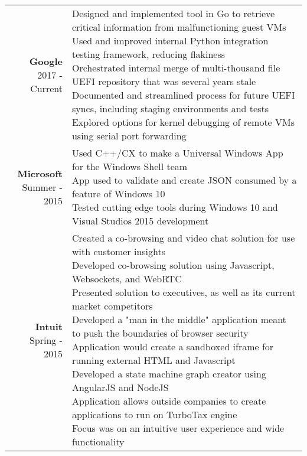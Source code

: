 \documentclass{article}
\makeatletter
\newcommand*\lineBr[2][c]{\begin{tabular}[#1]{@{}r@{}}#2\end{tabular}}
\newcommand*\lineBl[2][c]{\begin{tabular}[#1]{@{}l@{}}#2\end{tabular}}
\makeatother
\begin{document}
\begin{tabularx}{\textwidth}{ r | X }
  \vspace{4mm}
  \lineBr{ {\large {\bf Google }\\[2mm]2017 - Current}} &
  \lineBl{
	Designed and implemented tool in Go to retrieve critical information from malfunctioning guest VMs \\[2mm]
	Used and improved internal Python integration testing framework, reducing flakiness \\[2mm]
	Orchestrated internal merge of multi-thousand file UEFI repository that was several years stale \\[2mm]
	Documented and streamlined process for future UEFI syncs, including staging environments and tests \\[2mm]
	Explored options for kernel debugging of remote VMs using serial port forwarding
  } \\
  \vspace{4mm}
  \lineBr{ {\large {\bf Microsoft }\\[2mm]Summer - 2015}} &
  \lineBl{
    Used C++/CX to make a Universal Windows App for the Windows Shell team \\[2mm] 
    App used to validate and create JSON consumed by a feature of Windows 10 \\[2mm]
    Tested cutting edge tools during Windows 10 and Visual Studios 2015 development 
  } \\
  \vspace{4mm}
  \lineBr{ {\large {\bf Intuit }\\[2mm]Spring - 2015}} &
  \lineBl{
    Created a co-browsing and video chat solution for use with customer insights \\[2mm]
    Developed co-browsing solution using Javascript, Websockets, and WebRTC \\[2mm]
    Presented solution to executives, as well as its current market competitors \\[2mm]
    Developed a "man in the middle" application meant to push the boundaries of browser security \\[2mm]
    Application would create a sandboxed iframe for running external HTML and Javascript \\[2mm]
    Developed a state machine graph creator using AngularJS and NodeJS \\[2mm]
    Application allows outside companies to create applications to run on TurboTax engine \\[2mm]
    Focus was on an intuitive user experience and wide functionality 
}
\end{tabularx}
\end{document}
